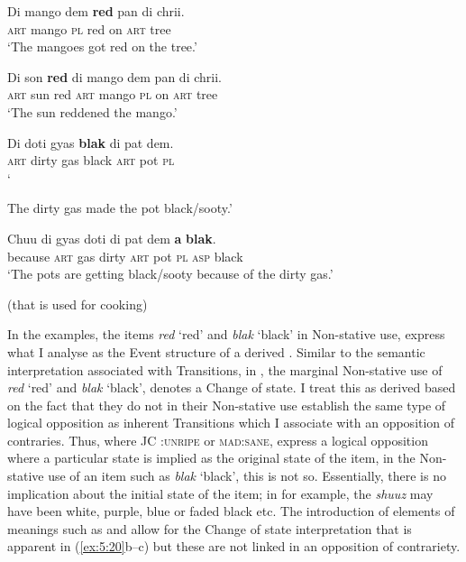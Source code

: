 \ex 
\gll Di mango dem \textbf{red} pan di chrii.\\
\textsc{art} mango {\textsc{pl}} red on \textsc{art} tree\\
\glt `The mangoes got red on the tree.'

\ex 
\gll Di son \textbf{red} di mango dem pan di chrii.\\
\textsc{art} sun red \textsc{art} mango {\textsc{pl}} on \textsc{art} tree\\
\glt `The sun reddened the mango.'
 \z
\z

\ea%
 \label{ex:5:23}
\ea 
\gll Di doti gyas \textbf{blak} di pat dem.\\
\textsc{art} dirty gas black \textsc{art} pot {\textsc{pl}}\\
\glt `{The dirty gas made the pot black/sooty.'

\ex 
\gll Chuu di gyas doti di pat dem \textbf{a} \textbf{blak}.\\
 because \textsc{art} gas dirty \textsc{art} pot {\textsc{pl}} \textsc{asp} black\\
\glt `The pots are getting black\slash sooty because of the dirty gas.'} (that is used for cooking)
 \z
\z

In the examples,  the items \textit{red} `red' and \textit{blak} `black' in Non-stative use, express what I analyse as the Event structure of a derived . Similar to the semantic interpretation associated with Transitions, in , the marginal Non-stative use of \textit{red} `red' and \textit{blak} `black', denotes a Change of state. I treat this as derived based on the fact that they do not in their Non-stative use establish the same type of logical opposition as inherent Transitions which I associate with an opposition of contraries. Thus, where JC \RIPE:\textsc{unripe} or \textsc{mad:sane}, express a logical opposition where a particular state is implied as the original state of the item, in the Non-stative use of an item such as \textit{blak} `black', this is not so. Essentially, there is no implication about the initial state of the item; in  for example, the \textit{shuuz} may have been white, purple, blue or faded black etc. The introduction of elements of meanings such as \BECOME and \CAUSE allow for the Change of state interpretation that is apparent in (\ref{ex:5:20}b--c) but these are not linked in an opposition of contrariety. 

